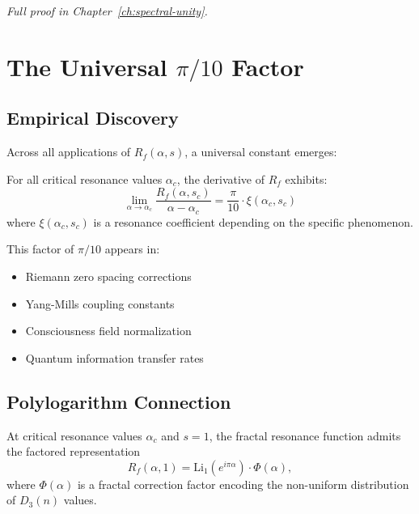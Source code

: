 \textit{Full proof in Chapter~\ref{ch:spectral-unity}.}

\section{The Universal $\pi/10$ Factor}
\label{sec:pi-over-10}


\subsection{Empirical Discovery}

Across all applications of $R_f(\alpha, s)$, a universal constant emerges:

\begin{observation}
For all critical resonance values $\alpha_c$, the derivative of $R_f$ exhibits:
\begin{equation}
\lim_{\alpha \to \alpha_c} \frac{R_f(\alpha, s_c)}{\alpha - \alpha_c} = \frac{\pi}{10} \cdot \xi(\alpha_c, s_c)
\end{equation}
where $\xi(\alpha_c, s_c)$ is a resonance coefficient depending on the specific phenomenon.
\end{observation}

This factor of $\pi/10$ appears in:
\begin{itemize}
\item Riemann zero spacing corrections
\item Yang-Mills coupling constants
\item Consciousness field normalization
\item Quantum information transfer rates
\end{itemize}

\subsection{Polylogarithm Connection}

\begin{proposition}[Polylogarithm Decomposition of $R_f$ at $s=1$]
\label{prop:polylog-decomposition}
At critical resonance values $\alpha_c$ and $s = 1$, the fractal resonance function admits the factored representation
\begin{equation}
\label{eq:rf-polylog-decomposition}
R_f(\alpha, 1) = \text{Li}_1(e^{i\pi\alpha}) \cdot \Phi(\alpha),
\end{equation}
where $\Phi(\alpha)$ is a fractal correction factor encoding the non-uniform distribution of $D_3(n)$ values.
\end{proposition}

